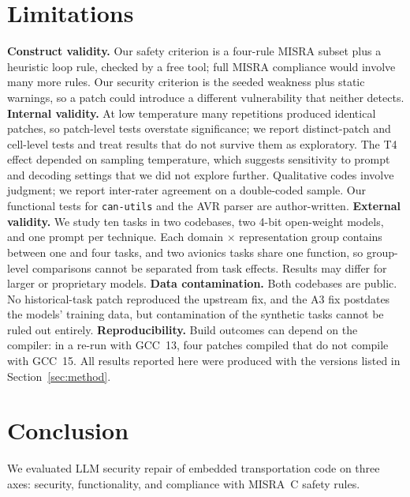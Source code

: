 \documentclass[12pt]{IEEEtran}
\begin{document}
\section{Limitations}
\textbf{Construct validity.} Our safety criterion is a four-rule MISRA subset plus a heuristic loop rule, checked by a free tool; full MISRA compliance would involve many more rules. Our security criterion is the seeded weakness plus static warnings, so a patch could introduce a different vulnerability that neither detects.
\textbf{Internal validity.} At low temperature many repetitions produced identical patches, so patch-level tests overstate significance; we report distinct-patch and cell-level tests and treat results that do not survive them as exploratory. The T4 effect depended on sampling temperature, which suggests sensitivity to prompt and decoding settings that we did not explore further. Qualitative codes involve judgment; we report inter-rater agreement on a double-coded sample. Our functional tests for \texttt{can-utils} and the AVR parser are author-written.
\textbf{External validity.} We study ten tasks in two codebases, two 4-bit open-weight models, and one prompt per technique. Each domain $\times$ representation group contains between one and four tasks, and two avionics tasks share one function, so group-level comparisons cannot be separated from task effects. Results may differ for larger or proprietary models.
\textbf{Data contamination.} Both codebases are public. No historical-task patch reproduced the upstream fix, and the A3 fix postdates the models' training data, but contamination of the synthetic tasks cannot be ruled out entirely.
\textbf{Reproducibility.} Build outcomes can depend on the compiler: in a re-run with GCC~13, four patches compiled that do not compile with GCC~15. All results reported here were produced with the versions listed in Section~\ref{sec:method}.

\section{Conclusion}
We evaluated LLM security repair of embedded transportation code on three axes: security, functionality, and compliance with MISRA~C safety rules.
\end{document}

